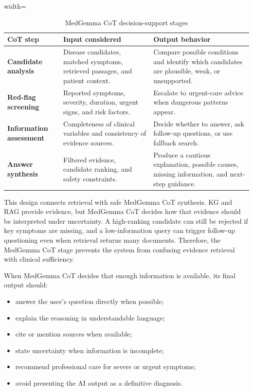 \begin{table}[H]
\centering
\begin{adjustbox}{width=\textwidth}
\begin{tabular}{>{\RaggedRight\arraybackslash}p{} >{\RaggedRight\arraybackslash}p{} >{\RaggedRight\arraybackslash}p{}}
\hline\hline
\textbf{CoT step} & \textbf{Input considered} & \textbf{Output behavior} \\
\hline
\textbf{Candidate analysis} & Disease candidates, matched symptoms, retrieved passages, and patient context. & Compare possible conditions and identify which candidates are plausible, weak, or unsupported. \\
\textbf{Red-flag screening} & Reported symptoms, severity, duration, urgent signs, and risk factors. & Escalate to urgent-care advice when dangerous patterns appear. \\
\textbf{Information assessment} & Completeness of clinical variables and consistency of evidence sources. & Decide whether to answer, ask follow-up questions, or use fallback search. \\
\textbf{Answer synthesis} & Filtered evidence, candidate ranking, and safety constraints. & Produce a cautious explanation, possible causes, missing information, and next-step guidance. \\
\hline\hline
\end{tabular}
\end{adjustbox}
\caption{MedGemma CoT decision-support stages}
\label{table:medgemma-cot-stages}
\end{table}

This design connects retrieval with safe MedGemma CoT synthesis. KG and RAG provide evidence, but MedGemma CoT decides how that evidence should be interpreted under uncertainty. A high-ranking candidate can still be rejected if key symptoms are missing, and a low-information query can trigger follow-up questioning even when retrieval returns many documents. Therefore, the MedGemma CoT stage prevents the system from confusing evidence retrieval with clinical sufficiency.

When MedGemma CoT decides that enough information is available, its final output should:

\begin{itemize}
    \item answer the user's question directly when possible;
    \item explain the reasoning in understandable language;
    \item cite or mention sources when available;
    \item state uncertainty when information is incomplete;
    \item recommend professional care for severe or urgent symptoms;
    \item avoid presenting the AI output as a definitive diagnosis.
\end{itemize}

